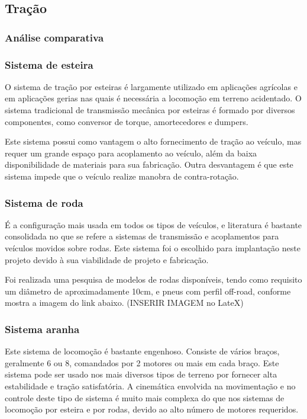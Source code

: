 \subsection{Tração}

\subsubsection{Análise comparativa}

\subsubsection{Sistema de esteira}

O sistema de tração por esteiras é largamente utilizado em aplicações agrícolas e em aplicações gerias nas quais é necessária a locomoção em terreno acidentado. O sistema tradicional de transmissão mecânica por esteiras é formado por diversos componentes, como conversor de torque, amortecedores e dumpers.

Este sistema possui como vantagem o alto fornecimento de tração ao veículo, mas requer um grande espaço para acoplamento ao veículo, além da baixa disponibilidade de materiais para sua fabricação. Outra desvantagem é que este sistema impede que o veículo realize manobra de contra-rotação.

\subsubsection{Sistema de roda}

É a configuração mais usada em todos os tipos de veículos, e literatura é bastante consolidada no que se refere a sistemas de transmissão e acoplamentos para veículos movidos sobre rodas. Este sistema foi o escolhido para implantação neste projeto devido à sua viabilidade de projeto e fabricação.

Foi realizada uma pesquisa de modelos de rodas disponíveis, tendo como requisito um diâmetro de aproximadamente 10cm, e pneus com perfil off-road, conforme mostra a imagem do link abaixo.  (INSERIR IMAGEM no LateX)

\subsubsection{Sistema aranha}

Este sistema de locomoção é bastante engenhoso. Consiste de vários braços, geralmente 6 ou 8, comandados por 2 motores ou mais em cada braço. Este sistema pode ser usado nos mais diversos tipos de terreno por fornecer alta  estabilidade e tração satisfatória. A cinemática envolvida na movimentação e no controle deste tipo de sistema é muito mais complexa do que nos sistemas de locomoção por esteira e por rodas, devido ao alto número de motores requeridos.

